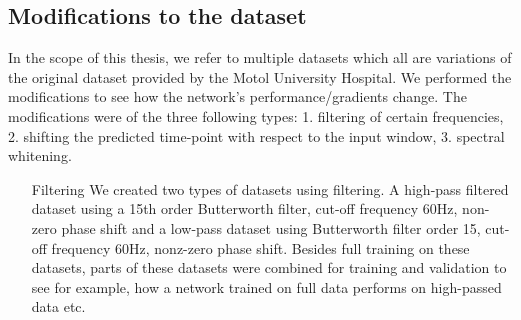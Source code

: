 \subsection{Modifications to the dataset}
In the scope of this thesis, we refer to multiple datasets which all are variations of the original dataset provided by the Motol University Hospital.
We performed the modifications to see how the network’s performance/gradients change.
The modifications were of the three following types: 1. filtering of certain frequencies, 2. shifting the predicted time-point with respect to the input window, 3. spectral whitening.
\begin{itemize}
\item[Filtering] We created two types of datasets using filtering. A high-pass filtered dataset using a 15th order Butterworth filter, cut-off frequency 60Hz, non-zero phase shift and a low-pass dataset using Butterworth filter order 15, cut-off frequency 60Hz, nonz-zero phase shift. Besides full training on these datasets, parts of these datasets were combined for training and validation to see for example, how a network trained on full data performs on high-passed data etc. \\


\end{itemize}
